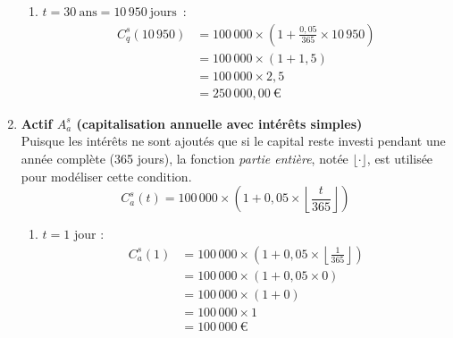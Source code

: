 \documentclass{article}
\begin{document}
\begin{enumerate}[label=\textbf{R1.\arabic*}]
\begin{enumerate}[label=(\alph*)]
                    \item $t = 30\ \text{ans} = 10\,950\ \text{jours}$~: 
                    \begin{align*}
                        C_q^s(10\,950) & = 100\,000 \times \left(1 + \frac{0,05}{365} \times 10\,950\right) \\
                        & = 100\,000 \times (1 + 1,5)                                        \\
                        & = 100\,000 \times 2,5                                              \\
                        & = \boxed{250\,000,00\ \text{€}}                                  
                    \end{align*}
                \end{enumerate}

                \item \textbf{Actif \( A_a^s \) (capitalisation annuelle avec intérêts simples)} \\
                Puisque les intérêts ne sont ajoutés que si le capital reste investi pendant une année complète (365 jours), la fonction \emph{partie entière}, notée $\lfloor \cdot \rfloor$, est utilisée pour modéliser cette condition.
                \[
                    C_a^s(t) = 100\,000 \times \left(1 + 0,05 \times \left\lfloor \frac{t}{365} \right\rfloor \right)
                \]
                \begin{enumerate}[label=(\alph*)]
                    \item \( t = 1 \) jour : 
                    \begin{align*}
                        C_a^s(1) & = 100\,000 \times \left(1 + 0,05 \times \left\lfloor \frac{1}{365} \right\rfloor \right) \\
                        & = 100\,000 \times \left(1 + 0,05 \times 0 \right)                                        \\
                        & = 100\,000 \times (1 + 0)                                                                \\
                        & = 100\,000 \times 1                                                                      \\
                        & = \boxed{100\,000\ \text{€}}                                                           
                    \end{align*}


\end{enumerate}
\end{enumerate}
\end{document}
